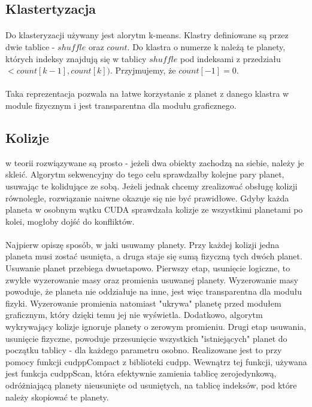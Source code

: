 \subsection{Klastertyzacja}

\paragraph{} Do klasteryzacji używany jest alorytm k-means. Klastry definiowane są przez dwie tablice - \ensuremath{shuffle} oraz \ensuremath{count}. Do klastra o numerze k należą te planety, których indeksy znajdują się w tablicy \ensuremath{shuffle} pod indeksami z przedziału \ensuremath{< count[k-1], count[k] )}. Przyjmujemy, że \ensuremath{count[-1] = 0}.

\paragraph{} Taka reprezentacja pozwala na łatwe korzystanie z planet z danego klastra w module fizycznym i jest transparentna dla modułu graficznego.

\subsection{Kolizje} w teorii rozwiązywane są prosto - jeżeli dwa obiekty zachodzą na siebie, należy je skleić. Algorytm sekwencyjny do tego celu sprawdzałby kolejne pary planet, usuwając te kolidujące ze sobą. Jeżeli jednak chcemy zrealizować obsługę kolizji równolegle, rozwiązanie naiwne okazuje się nie być prawidłowe. Gdyby każda planeta w osobnym wątku CUDA sprawdzała kolizje ze wszystkimi planetami po kolei, mogłoby dojść do konfliktów.

\paragraph{} Najpierw opiszę sposób, w jaki usuwamy planety. Przy każdej kolizji jedna planeta musi zostać usunięta, a druga staje się sumą fizyczną tych dwóch planet. Usuwanie planet przebiega dwuetapowo. Pierwszy etap, usunięcie logiczne, to zwykłe wyzerowanie masy oraz promienia usuwanej planety. Wyzerowanie masy powoduje, że planeta nie oddziałuje na inne, jest więc transparentna dla modułu fizyki. Wyzerowanie promienia natomiast "ukrywa" planetę przed modułem graficznym, który dzięki temu jej nie wyświetla. Dodatkowo, algorytm wykrywający kolizje ignoruje planety o zerowym promieniu.
Drugi etap usuwania, usunięcie fizyczne, powoduje przesunięcie wszystkich "istniejących" planet do początku tablicy - dla każdego parametru osobno. Realizowane jest to przy pomocy funkcji cudppCompact z biblioteki cudpp.
Wewnątrz tej funkcji, używana jest funkcja cudppScan, która efektywnie zamienia tablicę zerojedynkową, odróżniającą planety nieusunięte od usuniętych, na tablicę indeksów, pod które należy skopiować te planety.

